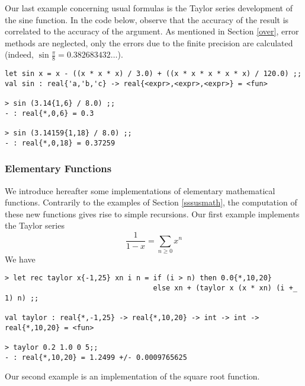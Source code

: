 Our last example concerning usual formulas is the Taylor series development of the sine function. In the
code below, observe
that the accuracy of the result is correlated to the accuracy of the argument.
As mentioned in Section \ref{over}, error methods are neglected, only the errors due
to the finite precision are calculated (indeed, $\sin \frac{\pi}{8}=0.382683432\ldots$).

\begin{verbatim}
let sin x = x - ((x * x * x) / 3.0) + ((x * x * x * x * x) / 120.0) ;;
val sin : real{'a,'b,'c} -> real{<expr>,<expr>,<expr>} = <fun>

> sin (3.14{1,6} / 8.0) ;;
- : real{*,0,6} = 0.3

> sin (3.14159{1,18} / 8.0) ;;
- : real{*,0,18} = 0.37259
\end{verbatim}


\subsubsection{Elementary Functions}

We introduce hereafter some implementations of elementary mathematical functions.
Contrarily to the examples of Section \ref{sssusmath},
the computation of these new functions gives rise to simple recursions.
Our first example implements the Taylor series
\begin{equation}
\frac{1}{1-x}=\sum_{n\ge 0} x^n
\end{equation}
We have

\begin{verbatim}
> let rec taylor x{-1,25} xn i n = if (i > n) then 0.0{*,10,20}
                                   else xn + (taylor x (x * xn) (i +_ 1) n) ;;

val taylor : real{*,-1,25} -> real{*,10,20} -> int -> int -> real{*,10,20} = <fun>

> taylor 0.2 1.0 0 5;;
- : real{*,10,20} = 1.2499 +/- 0.0009765625
\end{verbatim}

Our second example is an implementation of the square root function.

\begin{verbatim}

\end{verbatim}



